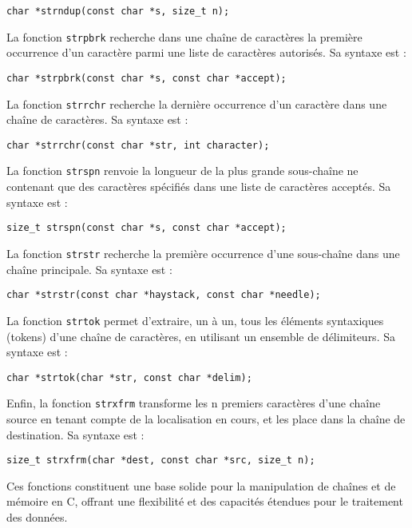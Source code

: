 \documentclass[french,11pt]{article}
\begin{document}
\begin{verbatim}
char *strndup(const char *s, size_t n);
\end{verbatim}

La fonction \texttt{strpbrk} recherche dans une chaîne de caractères la première occurrence d'un caractère parmi une liste de caractères autorisés. Sa syntaxe est :

\begin{verbatim}
char *strpbrk(const char *s, const char *accept);
\end{verbatim}

La fonction \texttt{strrchr} recherche la dernière occurrence d'un caractère dans une chaîne de caractères. Sa syntaxe est :

\begin{verbatim}
char *strrchr(const char *str, int character);
\end{verbatim}

La fonction \texttt{strspn} renvoie la longueur de la plus grande sous-chaîne ne contenant que des caractères spécifiés dans une liste de caractères acceptés. Sa syntaxe est :

\begin{verbatim}
size_t strspn(const char *s, const char *accept);
\end{verbatim}

La fonction \texttt{strstr} recherche la première occurrence d'une sous-chaîne dans une chaîne principale. Sa syntaxe est :

\begin{verbatim}
char *strstr(const char *haystack, const char *needle);
\end{verbatim}

La fonction \texttt{strtok} permet d'extraire, un à un, tous les éléments syntaxiques (tokens) d'une chaîne de caractères, en utilisant un ensemble de délimiteurs. Sa syntaxe est :

\begin{verbatim}
char *strtok(char *str, const char *delim);
\end{verbatim}

Enfin, la fonction \texttt{strxfrm} transforme les n premiers caractères d'une chaîne source en tenant compte de la localisation en cours, et les place dans la chaîne de destination. Sa syntaxe est :

\begin{verbatim}
size_t strxfrm(char *dest, const char *src, size_t n);
\end{verbatim}

Ces fonctions constituent une base solide pour la manipulation de chaînes et de mémoire en C, offrant une flexibilité et des capacités étendues pour le traitement des données.
\end{document}
